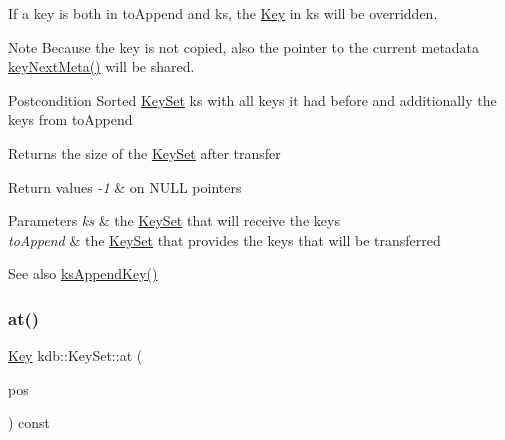 If a key is both in to\+Append and ks, the \hyperlink{classkdb_1_1Key}{Key} in ks will be overridden.

\begin{DoxyNote}{Note}
Because the key is not copied, also the pointer to the current metadata \hyperlink{group__keymeta_ga4c88342f580a4291455a801af71ce048}{key\+Next\+Meta()} will be shared.
\end{DoxyNote}
\begin{DoxyPostcond}{Postcondition}
Sorted \hyperlink{classkdb_1_1KeySet}{Key\+Set} ks with all keys it had before and additionally the keys from to\+Append 
\end{DoxyPostcond}
\begin{DoxyReturn}{Returns}
the size of the \hyperlink{classkdb_1_1KeySet}{Key\+Set} after transfer 
\end{DoxyReturn}

\begin{DoxyRetVals}{Return values}
{\em -\/1} & on N\+U\+LL pointers \\
\hline
\end{DoxyRetVals}

\begin{DoxyParams}{Parameters}
{\em ks} & the \hyperlink{classkdb_1_1KeySet}{Key\+Set} that will receive the keys \\
\hline
{\em to\+Append} & the \hyperlink{classkdb_1_1KeySet}{Key\+Set} that provides the keys that will be transferred \\
\hline
\end{DoxyParams}
\begin{DoxySeeAlso}{See also}
\hyperlink{group__keyset_gaa5a1d467a4d71041edce68ea7748ce45}{ks\+Append\+Key()} 
\end{DoxySeeAlso}
\mbox{\label{classkdb_1_1KeySet_a40e32f2d9f34f03fa8ec85945f49b630}} 
\subsubsection{\texorpdfstring{at()}{at()}}
{\footnotesize\ttfamily \hyperlink{classkdb_1_1Key}{Key} kdb\+::\+Key\+Set\+::at (\begin{DoxyParamCaption}\item[{elektra\+Cursor}]{pos }\end{DoxyParamCaption}) const\hspace{0.3cm}{\ttfamily [inline]}}



